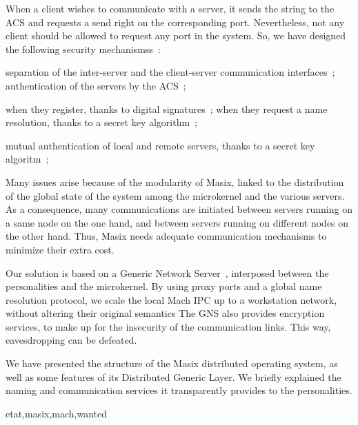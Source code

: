 When a client wishes to communicate with a server, it sends the string to 
the ACS and requests a send right on the corresponding port. Nevertheless, 
not any client should be allowed to request any port in the system.
So, we have designed the following security mechanismss~:
\begin{itemize}
\myitem separation of the inter-server and the client-server communication 
interfaces~;
\myitem authentication of the servers by the ACS~;
        \begin{itemize}
        \myitem when they register, thanks to digital signatures~;
        \myitem when they request a name resolution, thanks to a secret key 
algorithm~;
        \end{itemize}
\myitem mutual authentication of local and remote servers, thanks to a secret key algoritm~;
\end{itemize}


Many issues arise because of the modularity of Masix,
linked to the distribution of the global state of the system among 
the microkernel and the various servers. As a consequence, many
communications are initiated between servers running on a same node on
the one hand, and between servers running on different nodes on the other hand.
Thus, Masix needs adequate communication mechanisms to minimize their extra 
cost. 

Our solution is based on a Generic Network Server~\cite{rennes95}, 
interposed between the personalities and the microkernel. 
By using proxy ports and a global name resolution protocol, we scale the 
local Mach IPC up to a workstation network, without altering their 
original semantics
The GNS also provides encryption services, to make up for the insecurity 
of the communication links. This way, eavesdropping can be defeated.


We have presented the structure of the Masix distributed operating
system, as well as some features of its Distributed Generic Layer. 
We briefly explained the naming and communication services it transparently 
provides to the personalities.


 {etat,masix,mach,wanted}


